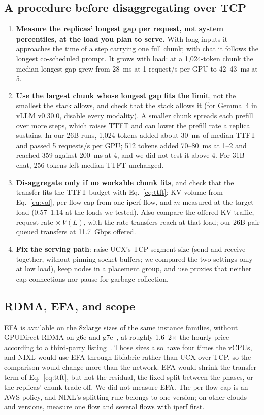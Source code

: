 \documentclass[11pt]{article}
\begin{document}
\subsection{A procedure before disaggregating over TCP}
\begin{enumerate}
  \item \textbf{Measure the replicas' longest gap per request, not system percentiles, at the load you plan to serve.} With long inputs it approaches the time of a step carrying one full chunk; with chat it follows the longest co-scheduled prompt. It grows with load: at a 1,024-token chunk the median longest gap grew from 28~ms at 1 request/s per GPU to 42--43~ms at 5.
  \item \textbf{Use the largest chunk whose longest gap fits the limit}, not the smallest the stack allows, and check that the stack allows it (for Gemma~4 in vLLM v0.30.0, disable every modality). A smaller chunk spreads each prefill over more steps, which raises TTFT and can lower the prefill rate a replica sustains. In our 26B runs, 1,024 tokens added about 30~ms of median TTFT and passed 5 requests/s per GPU; 512 tokens added 70--80~ms at 1--2 and reached 359 against 200~ms at 4, and we did not test it above 4. For 31B chat, 256 tokens left median TTFT unchanged.
  \item \textbf{Disaggregate only if no workable chunk fits}, and check that the transfer fits the TTFT budget with Eq.~\eqref{eq:ttft}: KV volume from Eq.~\eqref{eq:vol}, per-flow cap from one iperf flow, and $m$ measured at the target load (0.57--1.14 at the loads we tested). Also compare the offered KV traffic, request rate $\times\,V(L)$, with the rate transfers reach at that load; our 26B pair queued transfers at 11.7~Gbps offered.
  \item \textbf{Fix the serving path}: raise UCX's TCP segment size (send and receive together, without pinning socket buffers; we compared the two settings only at low load), keep nodes in a placement group, and use proxies that neither cap connections nor pause for garbage collection.
\end{enumerate}

\subsection{RDMA, EFA, and scope}
EFA is available on the 8xlarge sizes of the same instance families, without GPUDirect RDMA on g6e and g7e~\cite{awsefa}, at roughly 1.6--2$\times$ the hourly price according to a third-party listing~\cite{vantage}. Those sizes also have four times the vCPUs, and NIXL would use EFA through libfabric rather than UCX over TCP, so the comparison would change more than the network. EFA would shrink the transfer term of Eq.~\eqref{eq:ttft}, but not the residual, the fixed split between the phases, or the replicas' chunk trade-off. We did not measure EFA. The per-flow cap is an AWS policy, and NIXL's splitting rule belongs to one version; on other clouds and versions, measure one flow and several flows with iperf first.
\end{document}
